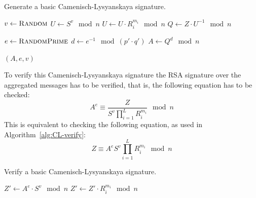 \begin{algorithm}
  \caption{Generate a basic Camenisch-Lysyanskaya signature.}
  \label{alg:CL-sign}
  \addtolength{\baselineskip}{1mm}
  \begin{algorithmic}[1]
      \State $v \gets \Call{Random}{}$
      \State $U \gets S^v \mod n$
        \State $U \gets U \cdot R_i^{m_i} \mod n$
      \EndFor
      \State $Q \gets Z \cdot U^{-1} \mod n$

      \State $e \gets \Call{RandomPrime}{}$
      \State $d \gets e^{-1} \mod (p' \cdot q')$
      \State $A \gets Q^d \mod n$

      \Return $(A, e, v)$
    \EndFunction
  \end{algorithmic}
\end{algorithm}

To verify this Camenisch-Lysyanskaya signature the RSA signature over the
aggregated messages has to be verified, that is, the following equation has to
be checked:
\begin{equation*}
  A^e \equiv \dfrac{Z}{S^v \prod_{i=1}^{L} R_i^{m_i}} \mod n
\end{equation*}
This is equivalent to checking the following equation, as used in
Algorithm~\ref{alg:CL-verify}:
\begin{equation*}
  Z \equiv A^e S^v \prod_{i=1}^{L} R_i^{m_i} \mod n
\end{equation*}

\begin{algorithm}
  \caption{Verify a basic Camenisch-Lysyanskaya signature.}
  \label{alg:CL-verify}
  \addtolength{\baselineskip}{1mm}
  \begin{algorithmic}[1]
      \State $Z' \gets A^e \cdot S^v \mod n$
        \State $Z' \gets Z' \cdot R_i^{m_i} \mod n$
      \EndFor

        \Return {}
      \EndIf

      \Return {}
    \EndFunction
  \end{algorithmic}
\end{algorithm}



